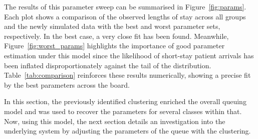 \documentclass[11pt]{article}
\newlength{\tabwidth}
\begin{document}
The results of this parameter sweep can be summarised in
Figure~\ref{fig:params}. Each plot shows a comparison of the observed lengths of
stay across all groups and the newly simulated data with the best and worst
parameter sets, respectively. In the best case, a very close fit has been found.
Meanwhile, Figure~\ref{fig:worst_params} highlights the importance of good
parameter estimation under this model since the likelihood of short-stay patient
arrivals has been inflated disproportionately against the tail of the
distribution. Table~\ref{tab:comparison} reinforces these results numerically,
showing a precise fit by the best parameters across the board.

\begin{table}
    \centering
    \caption{A comparison of the observed data, and the best and worst simulated
        data based on the model parameters and summary statistics for length of
    stay (LOS).}\label{tab:comparison}
\end{table}

In this section, the previously identified clustering enriched the overall
queuing model and was used to recover the parameters for several classes within
that. Now, using this model, the next section details an investigation into the
underlying system by adjusting the parameters of the queue with the clustering.
\end{document}

